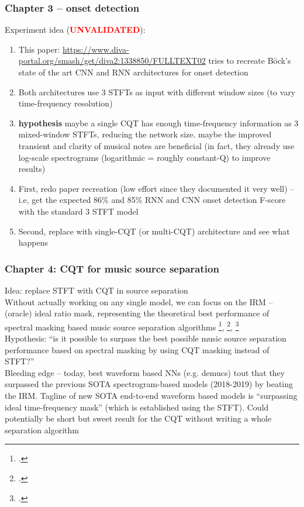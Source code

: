 \documentclass[usenames,dvipsnames]{beamer}
\begin{document}
\begin{frame}
	\frametitle{Chapter 3 -- onset detection}
	Experiment idea (\textcolor{red}{\textbf{UNVALIDATED}}):
	\begin{enumerate}
		\item
			This paper: \href{https://www.diva-portal.org/smash/get/diva2:1338850/FULLTEXT02}{https://www.diva-portal.org/smash/get/diva2:1338850/FULLTEXT02} tries to recreate B{\"o}ck's state of the art CNN and RNN architectures for onset detection
		\item
			Both architectures use 3 STFTs as input with different window sizes (to vary time-frequency resolution)
		\item
			\textbf{hypothesis} maybe a single CQT has enough time-frequency information as 3 mixed-window STFTs, reducing the network size. maybe the improved transient and clarity of musical notes are beneficial (in fact, they already use log-scale spectrograms (logarithmic = roughly constant-Q) to improve results)
		\item
			First, redo paper recreation (low effort since they documented it very well) -- i.e, get the expected 86\% and 85\% RNN and CNN onset detection F-score with the standard 3 STFT model
		\item
			Second, replace with single-CQT (or multi-CQT) architecture and see what happens
	\end{enumerate}
\end{frame}

\begin{frame}
	\frametitle{Chapter 4: CQT for music source separation}
	Idea: replace STFT with CQT in source separation\\
	\vspace{0.5em}
	Without actually working on any single model, we can focus on the IRM -- (oracle) ideal ratio mask, representing the theoretical  best performance of spectral masking based music source separation algorithms \footcite{irm}, \footcite{sigsep2018}, \footcite{vincent07}\\
	\vspace{0.5em}
	Hypothesis: ``is it possible to surpass the best possible music source separation performance based on spectral masking by using CQT masking instead of STFT?''\\
	\vspace{0.5em}
	Bleeding edge -- today, best waveform based NNs (e.g. demucs) tout that they surpassed the previous SOTA spectrogram-based models (2018-2019) by beating the IRM. Tagline of new SOTA end-to-end waveform based models is ``surpassing ideal time-frequency mask'' (which is established using the STFT). Could potentially be short but sweet result for the CQT without writing a whole separation algorithm
\end{frame}
\end{document}
